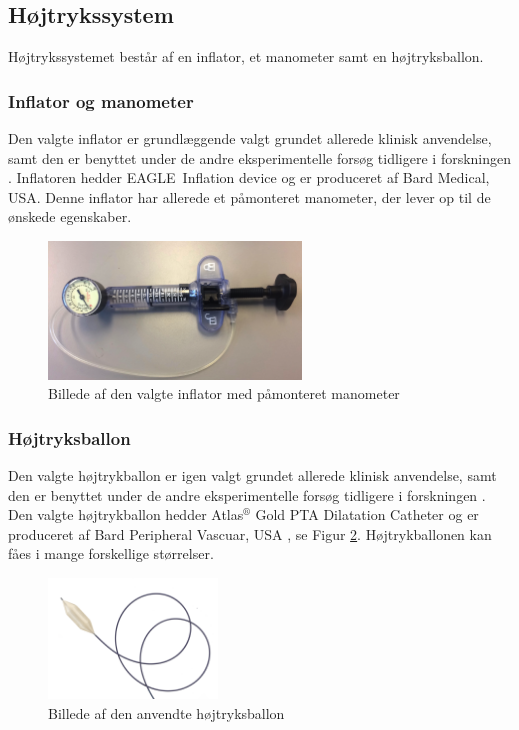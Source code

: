 \subsection{Højtrykssystem} \label{hojtrykssystem}
Højtrykssystemet består af en inflator, et manometer samt en højtryksballon. 

\subsubsection{Inflator og manometer}
Den valgte inflator er grundlæggende valgt grundet allerede klinisk anvendelse, samt den er benyttet under de andre eksperimentelle forsøg tidligere i forskningen \cite{rapport}. Inflatoren hedder EAGLE\texttrademark \ Inflation device og er produceret af Bard Medical, USA. Denne inflator har allerede et påmonteret manometer, der lever op til de ønskede egenskaber. 

\begin{figure}[H]
	\centering
	\includegraphics[width=0.6\textwidth]{Figure/Inflator}
	\caption{Billede af den valgte inflator med påmonteret manometer}
    \label{inflator}
\end{figure}

\subsubsection{Højtryksballon}
Den valgte højtrykballon er igen valgt grundet allerede klinisk anvendelse, samt den er benyttet under de andre eksperimentelle forsøg tidligere i forskningen \cite{rapport}. Den valgte højtrykballon hedder Atlas$^\circledR$ Gold PTA Dilatation Catheter og er produceret af Bard Peripheral Vascuar, USA \cite{DatabladAtlasGold}, se Figur \ref{hojtryksballon}. Højtrykballonen kan fåes i mange forskellige størrelser. 

\begin{figure}[H]
	\centering
	\includegraphics[width=0.4\textwidth]{Figure/ballon}
	\caption{Billede af den anvendte højtryksballon}
    \label{hojtryksballon}
\end{figure} 

